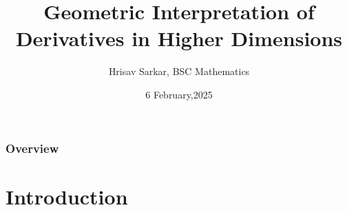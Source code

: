 \documentclass{beamer}
\title[Calculus of Several Variables]{Geometric Interpretation of Derivatives in Higher Dimensions } %
\author{Hrisav Sarkar, BSC Mathematics} %
\institute[Amity] %
{
Department of Mathematics, Amity University, Kolkata, India \\ %
\medskip
\textit{hrisav.sarkar@s.amity.edu } %
}
\date{6 February,2025} %
\begin{document}
\begin{frame}
\titlepage %
\end{frame}

\begin{frame}
\frametitle{Overview} %
\tableofcontents %
\end{frame}


\section{Introduction} %

\subsection{} %
\end{document}
